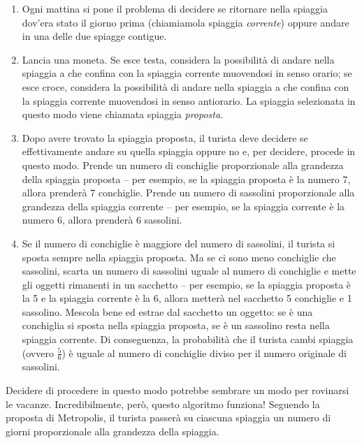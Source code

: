 \begin{enumerate}
  \item 
  Ogni mattina si pone il problema di decidere se ritornare nella spiaggia dov'era stato il giorno prima (chiamiamola spiaggia \emph{corrente}) oppure andare in una delle due spiagge contigue.
  \item 
  Lancia una moneta.
  Se esce testa, considera la possibilità di andare nella spiaggia a che confina con la spiaggia corrente muovendosi in senso orario; se esce croce, considera la possibilità di andare nella spiaggia a che confina con la spiaggia corrente muovendosi in senso antiorario.
La spiaggia selezionata in questo modo viene chiamata spiaggia \emph{proposta}.
  \item 
  Dopo avere trovato la spiaggia proposta, il turista deve decidere se effettivamente andare su quella spiaggia oppure no e, per decidere, procede in questo modo.
  Prende un numero di conchiglie proporzionale alla grandezza della spiaggia proposta -- per esempio, se la spiaggia proposta è la numero 7, allora prenderà 7 conchiglie.
  Prende un numero di sassolini proporzionale alla grandezza della spiaggia corrente -- per esempio, se la spiaggia corrente è la numero 6, allora prenderà 6 sassolini.
  \item
  Se il numero di conchiglie è maggiore del numero di sassolini, il turista si sposta sempre nella spiaggia proposta.
  Ma se ci sono meno conchiglie che sassolini, scarta un numero di sassolini uguale al numero di conchiglie e mette gli oggetti rimanenti in un sacchetto -- per esempio, se la spiaggia proposta è la 5 e la spiaggia corrente è la 6, allora metterà nel sacchetto 5 conchiglie e 1 sassolino.
  Mescola bene ed estrae dal sacchetto un oggetto: se è una conchiglia si sposta nella spiaggia proposta, se è un sassolino resta nella spiaggia corrente.
  Di conseguenza, la probabilità che il turista cambi spiaggia (ovvero $\frac{5}{6}$) è uguale al numero di conchiglie diviso per il numero originale di sassolini.
\end{enumerate}
Decidere di procedere in questo modo potrebbe sembrare un modo per rovinarsi le vacanze.
Incredibilmente, però, questo algoritmo funziona!
Seguendo la proposta di Metropolis, il turista passerà su ciascuna spiaggia un numero di giorni proporzionale alla grandezza della spiaggia.

